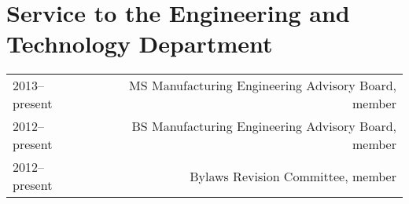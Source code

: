 \section*{Service to the Engineering and Technology Department}
\begin{tabular}{L!{\VRule}R}
2013--present&MS Manufacturing Engineering Advisory Board, member\\
2012--present&BS Manufacturing Engineering Advisory Board, member\\
2012--present&Bylaws Revision Committee, member
\end{tabular}